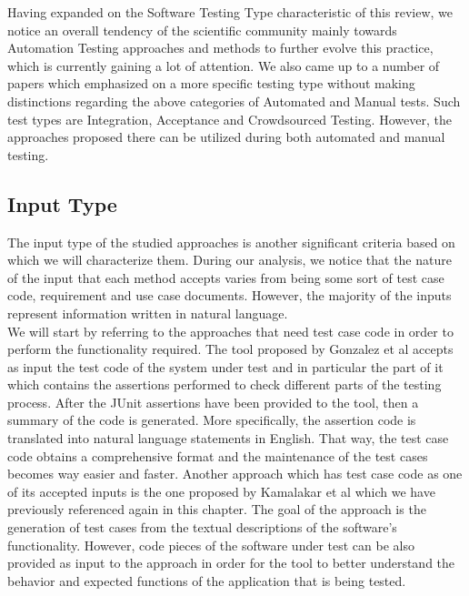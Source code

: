 Having expanded on the Software Testing Type characteristic of this review, we notice an overall tendency of the scientific community mainly towards Automation Testing approaches and methods to further 
evolve this practice, which is currently gaining a lot of attention. We also came up to a number of papers which emphasized on a more specific testing type without making distinctions regarding the 
above categories of Automated and Manual tests. Such test types are Integration, Acceptance and Crowdsourced Testing. However, the approaches proposed there can be utilized during both automated and manual testing.

\subsection {Input Type}
The input type of the studied approaches is another significant criteria based on which we will characterize them. During our analysis, we notice 
that the nature of the input that each method accepts varies from being some sort of test case code, requirement and use case documents. However, the 
majority of the inputs represent information written in natural language.\\

We will start by referring to the approaches that need test case code in order to perform the functionality required. The tool proposed by Gonzalez et al \cite{10.1145/3283812.3283819} accepts 
as input the test code of the system under test and in particular the part of it which contains the assertions performed to check different parts of the testing 
process. After the JUnit assertions have been provided to the tool, then a summary of the code is generated. More specifically, the assertion code 
is translated into natural language statements in English. That way, the test case code obtains a comprehensive format and the maintenance 
of the test cases becomes way easier and faster. Another approach which has test case code as one of its accepted inputs is the one proposed by 
Kamalakar et al \cite{kamalakar2013automatically} which we have previously referenced again in this chapter. The goal of the approach is the generation 
of test cases from the textual descriptions of the software's functionality. However, code pieces of the software under test can be also provided as input 
to the approach in order for the tool to better understand the behavior and expected functions of the application that is being tested.\\


